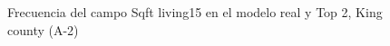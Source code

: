 \begin{figure}[H]
    \centering
    
    \caption{Frecuencia del campo Sqft living15 en el modelo real y Top 2, King county (A-2)}
    \label{frecuency-top2-sqft living15}
\end{figure}